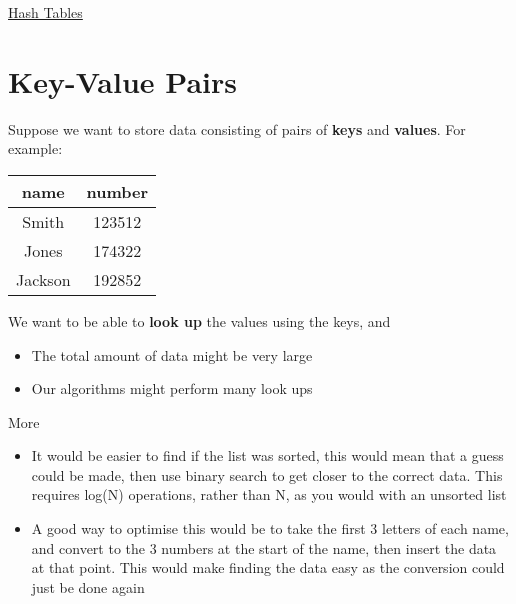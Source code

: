 \documentclass{article}[18pt]
\begin{document}
\begin{center}
\underline{\huge Hash Tables}
\end{center}
\section{Key-Value Pairs}
Suppose we want to store data consisting of pairs of \textbf{keys} and \textbf{values}. For example:
\begin{center}
\begin{tabular}{c|c}
name&number\\
\hline
Smith&123512\\
Jones&174322\\
Jackson&192852
\end{tabular}
\end{center}
We want to be able to \textbf{look up} the values using the keys, and
\begin{itemize}
\item The total amount of data might be very large
\item Our algorithms might perform many look ups
\end{itemize}
More
\begin{itemize}
\item It would be easier to find if the list was sorted, this would mean that a guess could be made, then use binary search to get closer to the correct data. This requires log(N) operations, rather than N, as you would with an unsorted list
\item A good way to optimise this would be to take the first 3 letters of each name, and convert to the 3 numbers at the start of the name, then insert the data at that point. This would make finding the data easy as the conversion could just be done again
\end{itemize}
\end{document}
